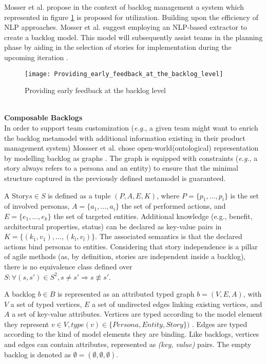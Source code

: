Mosser et al. propose in the context of backlog management a system which represented in figure \ref{fig:early_feedback} is proposed for utilization. Building upon the efficiency of NLP approaches. Mosser et al. suggest employing an NLP-based extractor to create a backlog model. This model will subsequently assist teams in the planning phase by aiding in the selection of stories for implementation during the upcoming iteration \cite{mosser2022modelling}.
\begin{figure}
\center
\texttt{[image: Providing\_early\_feedback\_at\_the\_backlog\_level]}
\caption{Providing early feedback at the backlog level \cite{mosser2022modelling}}\label{fig:early_feedback}
\end{figure}\\
\textbf{Composable Backlogs}\\
In order to support team customization (\emph{e.g.}, a given team might want to enrich the backlog metamodel with additional information existing in their product management system) Mossser et al. chose open-world(ontological) representation by modelling backlog as graphs \cite{mosser2022modelling}. The graph is equipped with constraints (\emph{e.g.}, a story always refers to a persona and an entity) to ensure that the minimal structure captured in the previously deﬁned metamodel is guaranteed.
\begin{definition}
A Story$s \in S$ is defined as a tuple $\left(P,A,E,K\right)$, where $P=\{p_1, ..., p_i\}$ is the set of involved personas, $A= \{a_1, ..., a_i\}$ the set of performed actions, and $E = \{e_1, ..., e_k\}$ the set of targeted entities. Additional knowledge (e.g., beneﬁt, architectural properties, status) can be declared as key-value pairs in $K = \{(k_1,v_1), ..., (k_l,v_l)\}$. The associated semantics is that the declared actions bind personas to entities. Considering that story independence is a pillar of agile methods (as, by deﬁnition, stories are independent inside a backlog), there is no equivalence class deﬁned over \\
$S: \forall (s,s')\in S^2, s\neq s' \Rightarrow s \not \equiv s'$.
\end{definition}
\begin{definition}
A backlog $b \in B$ is represented as an attributed typed graph $b = (V, E, A)$, with $V$ a set of typed vertices, $E$ a set of undirected edges linking existing vertices, and $A$ a set of key-value attributes. Vertices are typed according to the model element they represent $v \in V, type(v) \in \{ Persona, Entity, Story \} )$ . Edges are typed according to the kind of model elements they are binding. Like backlogs, vertices and edges can contain attributes, represented as \emph{(key, value)} pairs. The empty backlog is denoted as $\emptyset = (\emptyset ,\emptyset ,\emptyset )$.
\end{definition}
